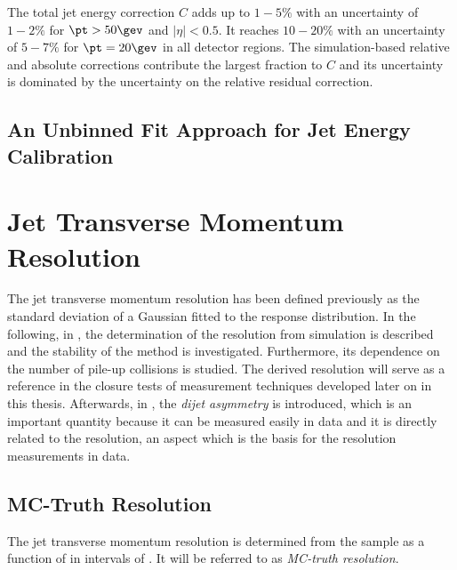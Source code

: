 The total jet energy correction $C$ adds up to $1-5\%$ with an uncertainty of $1-2\%$ for \mbox{$\pt > 50\gev$} and \mbox{$|\eta| < 0.5$}.
It reaches $10-20\%$ with an uncertainty of $5-7\%$ for \mbox{$\pt = 20\gev$} in all detector regions.
The simulation-based relative and absolute corrections contribute the largest fraction to $C$ and its uncertainty is dominated by the uncertainty on the relative residual correction.


\subsection{An Unbinned Fit Approach for Jet Energy Calibration}


\section{Jet Transverse Momentum Resolution}
The jet transverse momentum resolution has been defined previously as the standard deviation of a Gaussian fitted to the response distribution.
In the following, in , the determination of the resolution from simulation is described and the stability of the method is investigated.
Furthermore, its dependence on the number of pile-up collisions is studied.
The derived resolution will serve as a reference in the closure tests of measurement techniques developed later on in this thesis.
Afterwards, in , the \textit{dijet asymmetry} is introduced, which is an important quantity because it can be measured easily in data and it is directly related to the resolution, an aspect which is the basis for the resolution measurements in data.


\subsection{MC-Truth Resolution} \label{sec:Jets:Resolution:MCTruth}
The jet transverse momentum resolution is determined from the \pythia sample as a function of \ptgen in intervals of \etagen.
It will be referred to as \textit{MC-truth resolution}.

